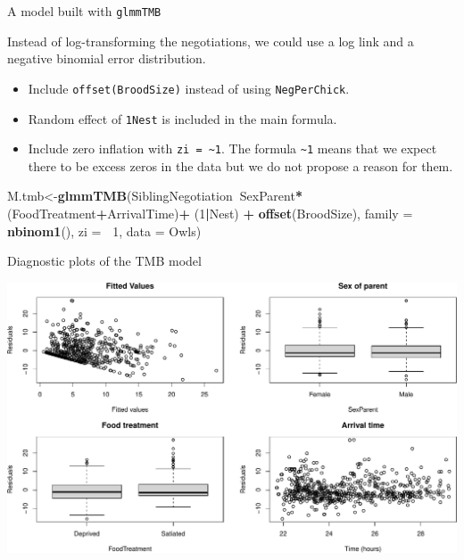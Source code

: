 \documentclass[
  ignorenonframetext,
]{beamer}
\newenvironment{Shaded}{\begin{snugshade}}{\end{snugshade}}
\newcommand{\DataTypeTok}[1]{\textcolor[rgb]{0.13,0.29,0.53}{#1}}
\newcommand{\DecValTok}[1]{\textcolor[rgb]{0.00,0.00,0.81}{#1}}
\newcommand{\KeywordTok}[1]{\textcolor[rgb]{0.13,0.29,0.53}{\textbf{#1}}}
\newcommand{\NormalTok}[1]{#1}
\newcommand{\OperatorTok}[1]{\textcolor[rgb]{0.81,0.36,0.00}{\textbf{#1}}}
\newcommand{\StringTok}[1]{\textcolor[rgb]{0.31,0.60,0.02}{#1}}
\providecommand{\tightlist}{%
  \setlength{\itemsep}{0pt}\setlength{\parskip}{0pt}}
\begin{document}
\begin{frame}[fragile]{A model built with \texttt{glmmTMB}}
\protect\hypertarget{a-model-built-with-glmmtmb}{}

Instead of log-transforming the negotiations, we could use a log link
and a negative binomial error distribution.

\begin{itemize}
\tightlist
\item
  Include \texttt{offset(BroodSize)} instead of using
  \texttt{NegPerChick}.
\item
  Random effect of \texttt{1\textbar{}Nest} is included in the main
  formula.
\item
  Include zero inflation with \texttt{zi\ =\ \textasciitilde{}1}. The
  formula \texttt{\textasciitilde{}1} means that we expect there to be
  excess zeros in the data but we do not propose a reason for them.
\end{itemize}

\scriptsize

\begin{Shaded}
\begin{Highlighting}[]
\NormalTok{M.tmb<-}\KeywordTok{glmmTMB}\NormalTok{(SiblingNegotiation}\OperatorTok{~}\NormalTok{SexParent}\OperatorTok{*}\NormalTok{(FoodTreatment}\OperatorTok{+}\NormalTok{ArrivalTime)}\OperatorTok{+}\StringTok{ }
\StringTok{                    }\NormalTok{(}\DecValTok{1}\OperatorTok{|}\NormalTok{Nest) }\OperatorTok{+}\StringTok{ }\KeywordTok{offset}\NormalTok{(BroodSize),}
                    \DataTypeTok{family =} \KeywordTok{nbinom1}\NormalTok{(), }\DataTypeTok{zi =} \OperatorTok{~}\DecValTok{1}\NormalTok{, }\DataTypeTok{data =}\NormalTok{ Owls)}
\end{Highlighting}
\end{Shaded}

\end{frame}

\begin{frame}{Diagnostic plots of the TMB model}
\protect\hypertarget{diagnostic-plots-of-the-tmb-model}{}

\scriptsize

\includegraphics{mixed_models_files/figure-beamer/unnamed-chunk-22-1.pdf}

\end{frame}
\end{document}
